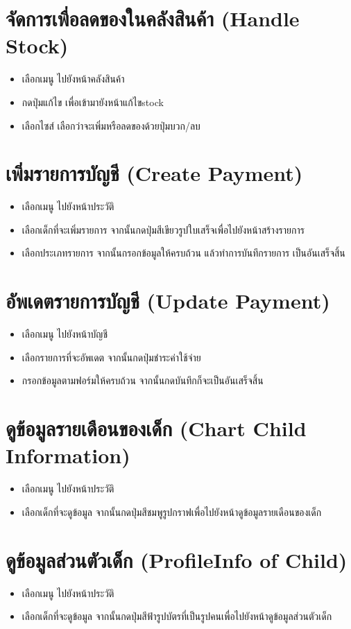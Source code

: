 \section{จัดการเพื่อลดของในคลังสินค้า (Handle Stock)}
\begin{itemize}
    \item เลือกเมนู ไปยังหน้าคลังสินค้า
    \item กดปุ่มแก้ไข เพื่อเข้ามายังหน้าแก้ไขstock
    \item เลือกไซส์ เลือกว่าจะเพิ่มหรือลดของด้วยปุ่มบวก/ลบ
\end{itemize}

\section{เพิ่มรายการบัญชี (Create Payment)}
\begin{itemize}
    \item เลือกเมนู ไปยังหน้าประวัติ
    \item เลือกเด็กที่จะเพิ่มรายการ จากนั้นกดปุ่มสีเขียวรูปใบเสร็จเพื่อไปยังหน้าสร้างรายการ
    \item เลือกประเภทรายการ จากนั้นกรอกข้อมูลให้ครบถ้วน แล้วทำการบันทึกรายการ เป็นอันเสร็จสิ้น
\end{itemize}

\section{อัพเดตรายการบัญชี (Update Payment)}
\begin{itemize}
    \item เลือกเมนู ไปยังหน้าบัญชี
    \item เลือกรายการที่จะอัพเดต จากนั้นกดปุ่มชำระค่าใช้จ่าย
    \item กรอกข้อมูลตามฟอร์มให้ครบถ้วน จากนั้นกดบันทึกก็จะเป็นอันเสร็จสิ้น
\end{itemize}

\section{ดูข้อมูลรายเดือนของเด็ก (Chart Child Information)}
\begin{itemize}
    \item เลือกเมนู ไปยังหน้าประวัติ
    \item เลือกเด็กที่จะดูข้อมูล จากนั้นกดปุ่มสีชมพูรูปกราฟเพื่อไปยังหน้าดูข้อมูลรายเดือนของเด็ก
\end{itemize}
\section{ดูข้อมูลส่วนตัวเด็ก (ProfileInfo of Child)}
\begin{itemize}
    \item เลือกเมนู ไปยังหน้าประวัติ
    \item เลือกเด็กที่จะดูข้อมูล จากนั้นกดปุ่มสีฟ้ารูปบัตรที่เป็นรูปคนเพื่อไปยังหน้าดูข้อมูลส่วนตัวเด็ก
\end{itemize}

